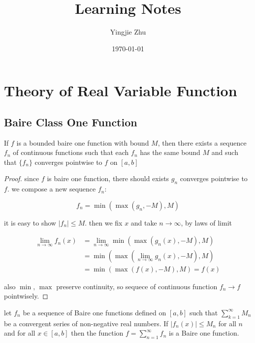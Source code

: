 \documentclass[11pt,a4paper]{article}
\title{Learning Notes}
\author{Yingjie Zhu}
\date{\today}
\begin{document}
\maketitle

\section{Theory of Real Variable Function}

\subsection{Baire Class One Function}

\begin{lem}
\label{lem:lem-1}
   If $f$ is a bounded baire one function with bound $M$, then there exists a sequence $f_n$ of continuous functions such that
   each $f_n$ has the same bound $M$ and such that $\{ f_n \}$ converges pointwise to $f$ on $[a,b]$
\end{lem}

\begin{proof}
    since $f$ is baire one function, there should exists $g_n$ converges pointwise to $f$. we compose a new sequence $f_n$:

    \[
        f_n = \min(\max(g_n, -M), M)
    \]

    it is easy to show $ |f_n| \le M$. then we fix $x$ and take $n \to \infty$, by laws of limit

    \begin{align*}
        \lim_{n \to \infty}f_n(x) &= \lim_{n \to \infty}\min(\max(g_n(x), -M), M) \\
        &= \min (\max(\lim_{n \to \infty}g_n(x), -M), M) \\
        &= \min (\max (f(x), -M), M) = f(x)
    \end{align*}

    also $\min,\, \max$ preserve continuity, so sequece of continuous function $f_n \to f$ pointwisely.
\end{proof}

\begin{lem}
    \label{lem:lem-2}
    let $f_n$ be a sequence of Baire one functions defined on $[a,b]$ such that $\sum_{k=1}^{\infty}M_n$ be 
    a convergent series of non-negative real numbers. If $|f_n(x)| \le M_n$ for all $n$ and for all $x \in [a,b]$ 
    then the function $f = \sum_{n=1}^{\infty}f_n$ is a Baire one function.
\end{lem}
\end{document}
